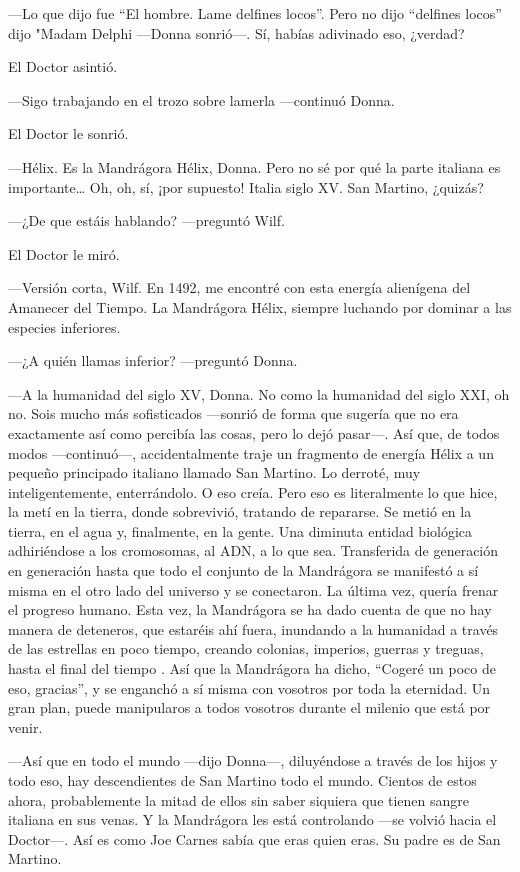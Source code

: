 ---Lo que dijo fue ``El hombre. Lame delfines locos''. Pero no dijo
``delfines locos'' dijo "Madam Delphi ---Donna sonrió---. Sí, habías
adivinado eso, ¿verdad?

El Doctor asintió.

---Sigo trabajando en el trozo sobre lamerla ---continuó Donna.

El Doctor le sonrió.

---Hélix. Es la Mandrágora Hélix, Donna. Pero no sé por qué la parte
italiana es importante\ldots{} Oh, oh, sí, ¡por supuesto! Italia siglo
XV. San Martino, ¿quizás?

---¿De que estáis hablando? ---preguntó Wilf.

El Doctor le miró.

---Versión corta, Wilf. En 1492, me encontré con esta energía alienígena
del Amanecer del Tiempo. La Mandrágora Hélix, siempre luchando por
dominar a las especies inferiores.

---¿A quién llamas inferior? ---preguntó Donna.

---A la humanidad del siglo XV, Donna. No como la humanidad del siglo
XXI, oh no. Sois mucho más sofisticados ---sonrió de forma que sugería
que no era exactamente así como percibía las cosas, pero lo dejó
pasar---. Así que, de todos modos ---continuó---, accidentalmente traje
un fragmento de energía Hélix a un pequeño principado italiano llamado
San Martino. Lo derroté, muy inteligentemente, enterrándolo. O eso
creía. Pero eso es literalmente lo que hice, la metí en la tierra, donde
sobrevivió, tratando de repararse. Se metió en la tierra, en el agua y,
finalmente, en la gente. Una diminuta entidad biológica adhiriéndose a
los cromosomas, al ADN, a lo que sea. Transferida de generación en
generación hasta que todo el conjunto de la Mandrágora se manifestó a sí
misma en el otro lado del universo y se conectaron. La última vez,
quería frenar el progreso humano. Esta vez, la Mandrágora se ha dado
cuenta de que no hay manera de deteneros, que estaréis ahí fuera,
inundando a la humanidad a través de las estrellas en poco tiempo,
creando colonias, imperios, guerras y treguas, hasta el final del tiempo
. Así que la Mandrágora ha dicho, ``Cogeré un poco de eso, gracias'', y
se enganchó a sí misma con vosotros por toda la eternidad. Un gran plan,
puede manipularos a todos vosotros durante el milenio que está por
venir.

---Así que en todo el mundo ---dijo Donna---, diluyéndose a través de
los hijos y todo eso, hay descendientes de San Martino todo el mundo.
Cientos de estos ahora, probablemente la mitad de ellos sin saber
siquiera que tienen sangre italiana en sus venas. Y la Mandrágora les
está controlando ---se volvió hacia el Doctor---. Así es como Joe Carnes
sabía que eras quien eras. Su padre es de San Martino.

